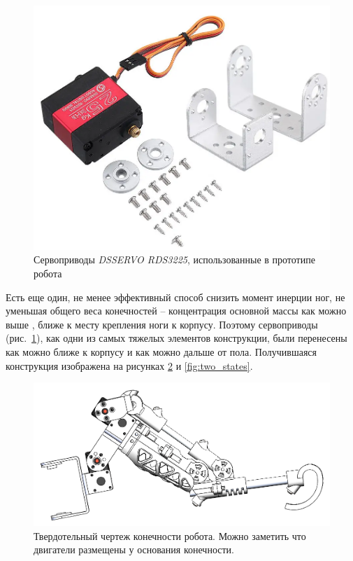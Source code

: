 \begin{figure}[h]
    \centering
    \includegraphics[scale=0.45]{chapter_mechanics_construction/figure6.png}
    \caption{Сервоприводы \textit{DSSERVO RDS3225}, использованные в прототипе робота}
    \label{fig:servo_demo}
\end{figure}

Есть еще один, не менее эффективный способ снизить момент инерции ног, не уменьшая общего веса конечностей -- концентрация основной массы как можно выше \cite{Seok2012}, ближе к месту крепления ноги к корпусу. Поэтому сервоприводы (рис.~\ref{fig:servo_demo}), как одни из самых тяжелых элементов конструкции, были перенесены как можно ближе к корпусу и как можно дальше от пола. Получившаяся конструкция изображена на рисунках \ref{fig:figg7} и \ref{fig:two_states}.

\begin{figure}[h]
    \centering
    \includegraphics[scale=0.7]{chapter_mechanics_construction/figure7.png}
    \caption{Твердотельный чертеж конечности робота. Можно заметить что двигатели размещены у основания конечности.}
    \label{fig:figg7}
\end{figure}

